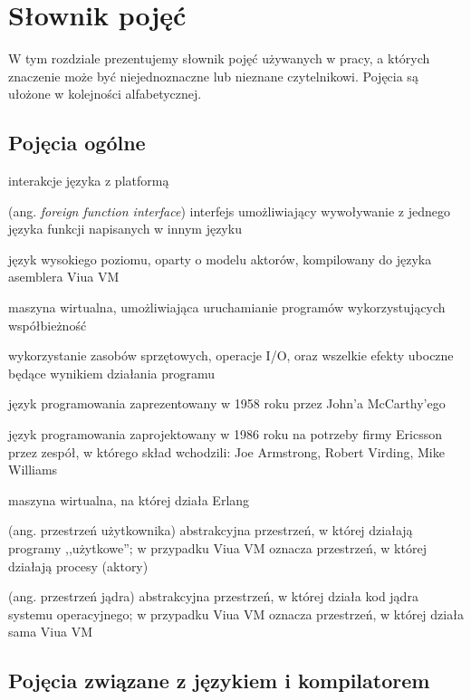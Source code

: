 \section{Słownik pojęć}
\label{slownik_pojec}

W tym rozdziale prezentujemy słownik pojęć używanych w pracy, a których znaczenie może być niejednoznaczne lub
nieznane czytelnikowi.
Pojęcia są ułożone w kolejności alfabetycznej.

\subsection{Pojęcia ogólne}
\label{slownik_pojec_ogolnych}

\begin{labeling}{interakcje języka z platformą}
    \item [FFI] (ang. \emph{foreign function interface}) interfejs umożliwiający wywoływanie z jednego języka
        funkcji napisanych w innym języku
    \item [\ViuAct] język wysokiego poziomu, oparty o modelu aktorów, kompilowany
        do języka asemblera Viua VM
    \item [Viua VM] maszyna wirtualna, umożliwiająca uruchamianie programów
        wykorzystujących współbieżność
    \item[interakcje języka z platformą] wykorzystanie zasobów sprzętowych, operacje I/O, oraz wszelkie
        efekty uboczne będące wynikiem działania programu
	\item [Lisp] język programowania zaprezentowany w 1958 roku przez John'a McCarthy'ego
	\item [Erlang] język programowania zaprojektowany w 1986 roku na potrzeby firmy Ericsson przez
		zespół, w którego skład wchodzili: Joe Armstrong, Robert Virding, Mike Williams
	\item [BEAM] maszyna wirtualna, na której działa Erlang
	\item [\emph{userspace}] (ang. przestrzeń użytkownika) abstrakcyjna przestrzeń, w której działają programy
		,,użytkowe''; w przypadku Viua VM oznacza przestrzeń, w której działają procesy (aktory)
	\item [\emph{kernelspace}] (ang. przestrzeń jądra) abstrakcyjna przestrzeń, w której działa kod jądra
		systemu operacyjnego; w przypadku Viua VM oznacza przestrzeń, w której działa sama Viua VM
\end{labeling}

\subsection{Pojęcia związane z językiem i kompilatorem}
\label{slownik_pojec_jezyka}

